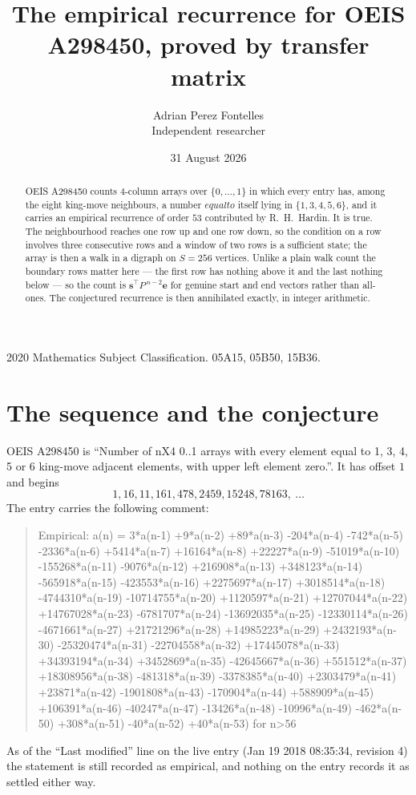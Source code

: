\documentclass[11pt,a4paper]{article}
\title{The empirical recurrence for OEIS A298450, proved by transfer matrix}
\author{Adrian Perez Fontelles\\ \small Independent researcher}
\date{31 August 2026}
\theoremstyle{plain}
\theoremstyle{definition}
\begin{document}
\maketitle

\begin{abstract}
OEIS A298450 counts $4$-column arrays over $\{0,\dots,1\}$ in which every entry has,
among the eight king-move neighbours, a number $equal to$ itself lying in $\{1,3,4,5,6\}$, and it carries an empirical
recurrence of order $53$ contributed by R.~H.~Hardin. It is true. The neighbourhood
reaches one row up and one row down, so the condition on a row involves three consecutive
rows and a window of two rows is a sufficient state; the array is then a walk in a digraph
on $S=256$ vertices. Unlike a plain walk count the boundary rows matter here --- the first
row has nothing above it and the last nothing below --- so the count is
$\mathbf{s}^{\!\top}P^{\,n-2}\mathbf{e}$ for genuine start and end vectors rather than
all-ones. The conjectured recurrence is then annihilated exactly, in integer arithmetic.
\end{abstract}

\noindent\small 2020 Mathematics Subject Classification. 05A15, 05B50, 15B36.\normalsize

\section{The sequence and the conjecture}

OEIS A298450 is ``Number of nX4 0..1 arrays with every element equal to 1, 3, 4, 5 or 6 king-move adjacent elements, with upper left element zero.''. It has offset
$1$ and begins
\[
1, 16, 11, 161, 478, 2459, 15248, 78163,\ \dots
\]
The entry carries the following comment:
\begin{quote}\small
Empirical: a(n) = 3*a(n-1) +9*a(n-2) +89*a(n-3) -204*a(n-4) -742*a(n-5) -2336*a(n-6) +5414*a(n-7) +16164*a(n-8) +22227*a(n-9) -51019*a(n-10) -155268*a(n-11) -9076*a(n-12) +216908*a(n-13) +348123*a(n-14) -565918*a(n-15) -423553*a(n-16) +2275697*a(n-17) +3018514*a(n-18) -4744310*a(n-19) -10714755*a(n-20) +1120597*a(n-21) +12707044*a(n-22) +14767028*a(n-23) -6781707*a(n-24) -13692035*a(n-25) -12330114*a(n-26) -4671661*a(n-27) +21721296*a(n-28) +14985223*a(n-29) +2432193*a(n-30) -25320474*a(n-31) -22704558*a(n-32) +17445078*a(n-33) +34393194*a(n-34) +3452869*a(n-35) -42645667*a(n-36) +551512*a(n-37) +18308956*a(n-38) -481318*a(n-39) -3378385*a(n-40) +2303479*a(n-41) +23871*a(n-42) -1901808*a(n-43) -170904*a(n-44) +588909*a(n-45) +106391*a(n-46) -40247*a(n-47) -13426*a(n-48) -10996*a(n-49) -462*a(n-50) +308*a(n-51) -40*a(n-52) +40*a(n-53) for n>56
\end{quote}
As of the ``Last modified'' line on the live entry (Jan 19 2018 08:35:34, revision
4) the statement is still recorded as empirical, and nothing on the entry
records it as settled either way.
\end{document}
